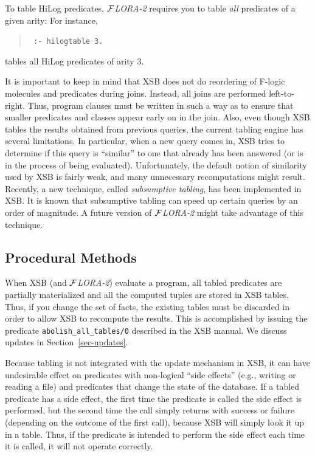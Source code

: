 \documentclass[11pt]{article}
\newcommand{\FLORA}{{\mbox{${\cal F}${\small\it LORA}\rm\emph{-2}}}\xspace}
\newcommand{\fl}{\mbox{F-logic}\xspace}
\begin{document}
To table HiLog predicates, \FLORA requires you to table \emph{all}
predicates of a given arity: For instance,
\begin{quote}
 \tt
 :- hilogtable 3.
\end{quote}
tables all HiLog predicates of arity 3.

It is important to keep in mind that XSB does not do reordering of \fl
molecules and predicates during joins. Instead, all joins are performed
left-to-right.  Thus, program clauses must be written in such a way as to
ensure that smaller predicates and classes appear early on in the join.
Also, even though XSB tables the results obtained from previous queries,
the current tabling engine has several limitations. In particular, when a
new query comes in, XSB tries to determine if this query is ``similar'' to
one that already has been answered (or is in the process of being
evaluated).  Unfortunately, the default notion of similarity used by XSB is
fairly weak, and many unnecessary recomputations might result. Recently, a
new technique, called \emph{subsumptive tabling}, has been implemented in
XSB. It is known that subsumptive tabling can speed up certain queries by
an order of magnitude. A future version of \FLORA might take advantage of
this technique.


\subsection{Procedural Methods}\label{sec-proc-methods}

When XSB (and \FLORA) evaluate a program, all tabled predicates are
partially materialized and all the computed tuples are stored in XSB
tables. Thus, if you change the set of facts, the existing tables must be
discarded in order to allow XSB to recompute the results. This is
accomplished by issuing the predicate {\tt abolish\_all\_tables/0}
described in the XSB manual. We discuss updates in
Section~\ref{sec-updates}.

%
Because tabling is not integrated with the update mechanism in XSB, it can
have undesirable effect on predicates with non-logical ``side effects''
(e.g., writing or reading a file) and predicates that change the state of
the database.  If a tabled predicate has a side effect, the first time the
predicate is called the side effect is performed, but the second time the
call simply returns with success or failure (depending on the outcome of
the first call), because XSB will simply look it up in a table.  Thus, if
the predicate is intended to perform the side effect each time it is
called, it will not operate correctly.
\end{document}
